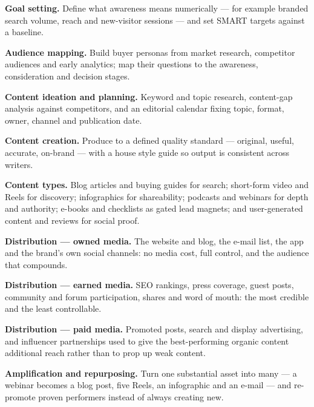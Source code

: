 \begin{qlist}
\begin{apts}
\item \textbf{Goal setting.} Define what awareness means numerically --- for
      example branded search volume, reach and new-visitor sessions --- and set
      SMART targets against a baseline.
\item \textbf{Audience mapping.} Build buyer personas from market research,
      competitor audiences and early analytics; map their questions to the
      awareness, consideration and decision stages.
\item \textbf{Content ideation and planning.} Keyword and topic research,
      content-gap analysis against competitors, and an editorial calendar fixing
      topic, format, owner, channel and publication date.
\item \textbf{Content creation.} Produce to a defined quality standard ---
      original, useful, accurate, on-brand --- with a house style guide so output
      is consistent across writers.
\item \textbf{Content types.} Blog articles and buying guides for search;
      short-form video and Reels for discovery; infographics for shareability;
      podcasts and webinars for depth and authority; e-books and checklists as
      gated lead magnets; and user-generated content and reviews for social
      proof.
\item \textbf{Distribution --- owned media.} The website and blog, the e-mail
      list, the app and the brand's own social channels: no media cost, full
      control, and the audience that compounds.
\item \textbf{Distribution --- earned media.} SEO rankings, press coverage,
      guest posts, community and forum participation, shares and word of mouth:
      the most credible and the least controllable.
\item \textbf{Distribution --- paid media.} Promoted posts, search and display
      advertising, and influencer partnerships used to give the best-performing
      organic content additional reach rather than to prop up weak content.
\item \textbf{Amplification and repurposing.} Turn one substantial asset into
      many --- a webinar becomes a blog post, five Reels, an infographic and an
      e-mail --- and re-promote proven performers instead of always creating new.

\end{apts}
\end{qlist}
